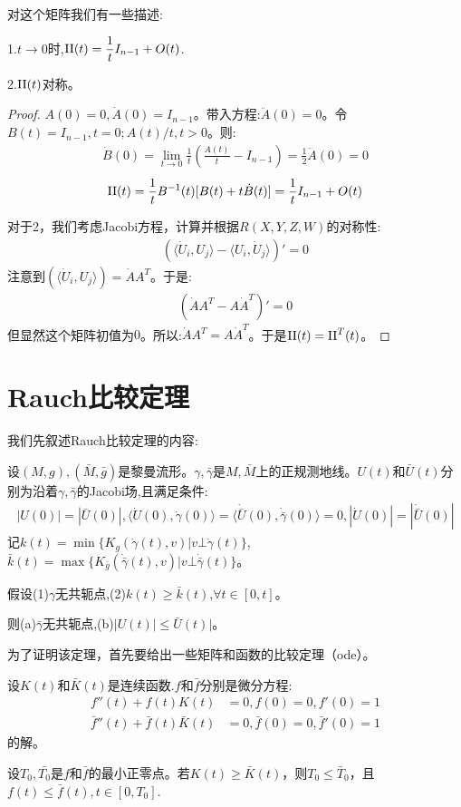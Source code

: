 对这个矩阵我们有一些描述:
\begin{lemma}
    1.$t \to 0$时,$\mathrm{II}(t)=\dfrac{1}{t}I_{n-1}+O(t)$.

    2.$\mathrm{II}(t)$对称。
\end{lemma}
\begin{proof}
    $A(0)=0,\dot{A}(0)=I_{n-1}$。带入方程:$\ddot{A}(0)=0$。令$B(t)=I_{n-1},t=0;A(t)/t,t>0$。则:
    \begin{align*}
        \dot{B}(0)=\lim_{t \to 0}\frac{1}{t}(\frac{A(t)}{t}-I_{n-1})=\frac{1}{2}\ddot{A}(0)=0
    \end{align*}
    \begin{align*}
        \mathrm{II}(t)=\frac{1}{t}B^{-1}(t)[B(t)+t\dot{B}(t)]=\frac{1}{t}I_{n-1}+O(t)
    \end{align*}

    对于2，我们考虑Jacobi方程，计算并根据$R(X,Y,Z,W)$的对称性:
    \begin{align*}
        (\langle \dot{U}_i,U_j\rangle-\langle U_i,\dot{U}_j\rangle)'=0
    \end{align*}
    注意到$(\langle \dot{U}_i,U_j\rangle)=\dot{A}A^T$。于是:
    \begin{align*}
        (\dot{A}A^T-A \dot{A}^T)'=0
    \end{align*}
    但显然这个矩阵初值为$0$。所以:$\dot{A}A^T=A \dot{A}^T$。于是$\mathrm{II}(t)=\mathrm{II}^T(t)$。
\end{proof}

\section{Rauch比较定理}
我们先叙述Rauch比较定理的内容:
\begin{theorem}[Rauch I]
    设$(M,g),(\bar{M},\bar{g})$是黎曼流形。$\gamma,\bar{\gamma}$是$M,\bar{M}$上的正规测地线。$U(t)$和$\bar{U}(t)$分别为沿着$\gamma,\bar{\gamma}$的Jacobi场,且满足条件:
    \begin{align*}
        |U(0)|=|\bar{U}(0)|,\langle \dot{U}(0),\dot{\gamma}(0)\rangle=\langle \dot{\bar{U}}(0),\dot{\bar{\gamma}}(0)\rangle=0, |\dot{U}(0)|=|\dot{\bar{U}}(0)|
    \end{align*}
    记$k(t)=\min\{K_g(\dot{\gamma}(t),v)|v \bot \dot{\gamma}(t)\}$, $\bar{k}(t)=\max\{K_{\bar{g}}(\dot{\bar{\gamma}}(t),v)|v \bot \dot{\bar{\gamma}}(t)\}$。

    假设(1)$\gamma$无共轭点,(2)$k(t) \geq \bar{k}(t)$,$\forall t \in [0,t]$。
    
    则(a)$\bar{\gamma}$无共轭点,(b)$|U(t)| \leq \bar{U}(t)|$。
\end{theorem}
为了证明该定理，首先要给出一些矩阵和函数的比较定理（ode）。
\begin{lemma}[函数]
    设$K(t)$和$\bar{K}(t)$是连续函数.$f$和$\bar{f}$分别是微分方程:
    \begin{align*}
        f''(t)+f(t)K(t)&=0,f(0)=0,f'(0)=1\\
        \bar{f}''(t)+\bar{f}(t)\bar{K}(t)&=0,\bar{f}(0)=0,\bar{f}'(0)=1
    \end{align*}的解。

    设$T_0,\bar{T_0}$是$f$和$\bar{f}$的最小正零点。若$K(t)\geq \bar{K}(t)$，则$T_0 \leq \bar{T}_0$，且$f(t) \leq \bar{f}(t),t \in [0,T_0]$.
\end{lemma}

